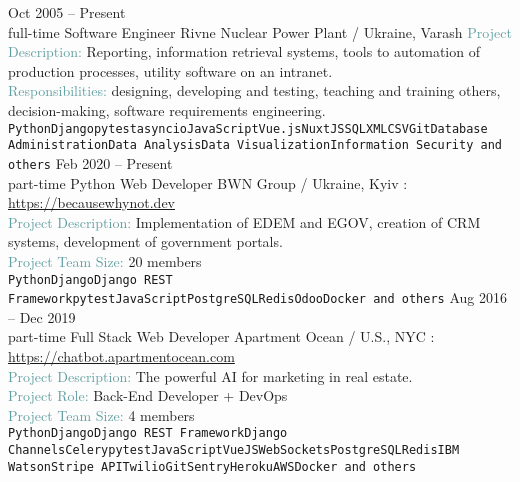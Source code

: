 \documentclass[9pt]{developercv} %
\begin{document}
\begin{entrylist}
	\entry
        {Oct 2005 -- Present\\\footnotesize{full-time}}
		{Software Engineer}
        {Rivne Nuclear Power Plant / Ukraine, Varash}
        {\textcolor{CadetBlue}{Project Description:} Reporting, information retrieval systems, tools to automation of production processes, utility software on an intranet.\\\textcolor{CadetBlue}{Responsibilities:} designing, developing and testing, teaching and training others, decision-making, software requirements engineering.\\
        \texttt{Python}\slashsep\texttt{Django}\slashsep\texttt{pytest}\slashsep\texttt{asyncio}\slashsep\texttt{JavaScript}\slashsep\texttt{Vue.js}\slashsep\texttt{NuxtJS}\slashsep\texttt{SQL}\slashsep\texttt{XML}\slashsep\texttt{CSV}\slashsep\texttt{Git}\slashsep\texttt{Database Administration}\slashsep\texttt{Data Analysis}\slashsep\texttt{Data Visualization}\slashsep\texttt{Information Security and others}}
	\entry
		{Feb 2020 -- Present\\\footnotesize{part-time}}
		{Python Web Developer}
        {BWN Group / Ukraine, Kyiv}
        {\faLink{}: {\href{https://becausewhynot.dev}{https://becausewhynot.dev}}\\\textcolor{CadetBlue}{Project Description:} Implementation of EDEM and EGOV, creation of CRM systems, development of government portals. \\\textcolor{CadetBlue}{Project Team Size:} 20 members\\ \texttt{Python}\slashsep\texttt{Django}\slashsep\texttt{Django REST Framework}\slashsep\texttt{pytest}\slashsep\texttt{JavaScript}\slashsep\texttt{PostgreSQL}\slashsep\texttt{Redis}\slashsep\texttt{Odoo}\slashsep\texttt{Docker and others}}
	\entry
		{Aug 2016 -- Dec 2019\\\footnotesize{part-time}}
		{Full Stack Web Developer}
        {Apartment Ocean / U.S., NYC}
        {\faLink{}: {\href{https://chatbot.apartmentocean.com}{https://chatbot.apartmentocean.com}}\\\textcolor{CadetBlue}{Project Description:} The powerful AI for marketing in real estate.\\\textcolor{CadetBlue}{Project Role:} Back-End Developer + DevOps\\ \textcolor{CadetBlue}{Project Team Size:} 4 members\\ \texttt{Python}\slashsep\texttt{Django}\slashsep\texttt{Django REST Framework}\slashsep\texttt{Django
        Channels}\slashsep\texttt{Celery}\slashsep\texttt{pytest}\slashsep\texttt{JavaScript}\slashsep\texttt{VueJS}\slashsep\texttt{WebSockets}\slashsep\texttt{PostgreSQL}\slashsep\texttt{Redis}\slashsep\texttt{IBM Watson}\slashsep\texttt{Stripe
API}\slashsep\texttt{Twilio}\slashsep\texttt{Git}\slashsep\texttt{Sentry}\slashsep\texttt{Heroku}\slashsep\texttt{AWS}\slashsep\texttt{Docker and others}}
\end{entrylist}
\end{document}
